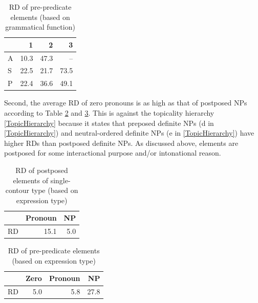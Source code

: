 \begin{table}
\centering
\caption{RD of pre-predicate elements (based on grammatical function)}
\label{RDASP}
\begin{tabular}{lrrr}
\toprule
		& 1	& 2	& 3 \\
\midrule
	A	& 10.3	& 47.3	& -- \\
	S	& 22.5	& 21.7	& 73.5 \\
	P	& 22.4	& 36.6	& 49.1 \\
\bottomrule
\end{tabular}
\end{table}

Second,
the average RD of zero pronouns is as high as that of postposed NPs
according to Table \ref{RDPostExpTypeT} and \ref{RDPreExpTypeT}.
This is against the topicality hierarchy \ref{TopicHierarchy}
because it states that
preposed definite NPs (d in \ref{TopicHierarchy}) and neutral-ordered definite NPs (e in \ref{TopicHierarchy}) have
higher RDs than
postposed definite NPs.
As discussed above,
elements are postposed for some interactional purpose and/or intonational reason.


\begin{table}
\centering
\caption{RD of postposed elements of single-contour type (based on expression type)}
\begin{tabular}{lrr}
\toprule
  & Pronoun & NP \\
\midrule
RD & 15.1 & 5.0 \\
\bottomrule
\end{tabular}
\label{RDPostExpTypeT}
\end{table}
\begin{table}
\centering
\caption{RD of pre-predicate elements (based on expression type)}
\begin{tabular}{lrrr}
\toprule
     & Zero & Pronoun & NP \\
\midrule
 RD  & 5.0  & 5.8     & 27.8 \\
\bottomrule
\end{tabular}
\label{RDPreExpTypeT}
\end{table}

